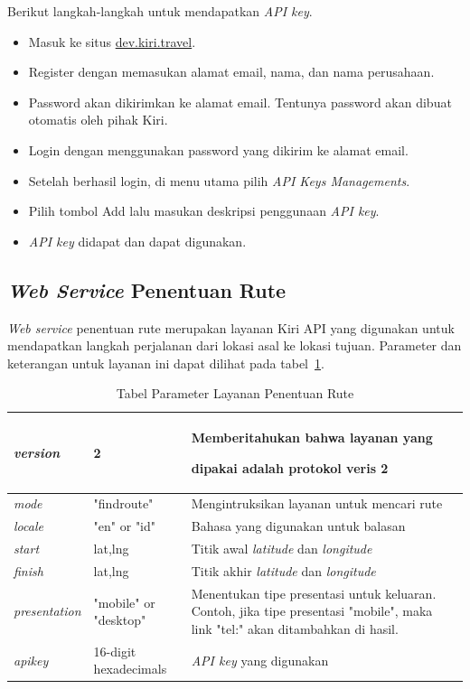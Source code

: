 Berikut langkah-langkah untuk mendapatkan \textit{API key}.
\begin{itemize}
	\item Masuk ke situs \url{dev.kiri.travel}.
	\item Register dengan memasukan alamat email, nama, dan nama perusahaan.
	\item Password akan dikirimkan ke alamat email. Tentunya password akan dibuat otomatis oleh pihak Kiri.
	\item Login dengan menggunakan password yang dikirim ke alamat email. 
	\item Setelah berhasil login, di menu utama pilih \textit{API Keys Managements}.
	\item Pilih tombol Add lalu masukan deskripsi penggunaan \textit{API key}.
	\item \textit{API key} didapat dan dapat digunakan.
\end{itemize}

\subsection{\textit{Web Service} Penentuan Rute}
\label{subsec:Web Service Penentuan Rute}
\hspace{0.5cm} \textit{Web service} penentuan rute merupakan layanan Kiri API yang digunakan untuk mendapatkan langkah perjalanan dari lokasi asal ke lokasi tujuan. Parameter dan keterangan untuk layanan ini dapat dilihat pada tabel~\ref{tab:routingWebService}.

\begin{table}[H]
	\centering
		\begin{tabular}{|p{2cm}|p{4cm}|p{8cm}|}
			\hline
			\textit{version} & 2 & Memberitahukan bahwa layanan yang \strut dipakai adalah protokol veris 2 \\ \hline
			\textit{mode} & "findroute" & Mengintruksikan layanan untuk mencari rute \\ \hline
			\textit{locale} & "en" or "id" & Bahasa yang digunakan untuk balasan \\ \hline
			\textit{start} & lat,lng & Titik awal \textit{latitude} dan \textit{longitude} \\ \hline
			\textit{finish} & lat,lng & Titik akhir \textit{latitude} dan \textit{longitude}  \\ \hline
			\textit{presentation} & "mobile" or "desktop" & Menentukan tipe presentasi untuk keluaran. Contoh, jika tipe presentasi "mobile", maka link "tel:" akan ditambahkan di hasil. \\ \hline
			\textit{apikey} & 16-digit hexadecimals & \textit{API key} yang digunakan \\ \hline
			\hline
		\end{tabular}
	\caption{Tabel Parameter Layanan Penentuan Rute}
	\label{tab:routingWebService}
\end{table}

